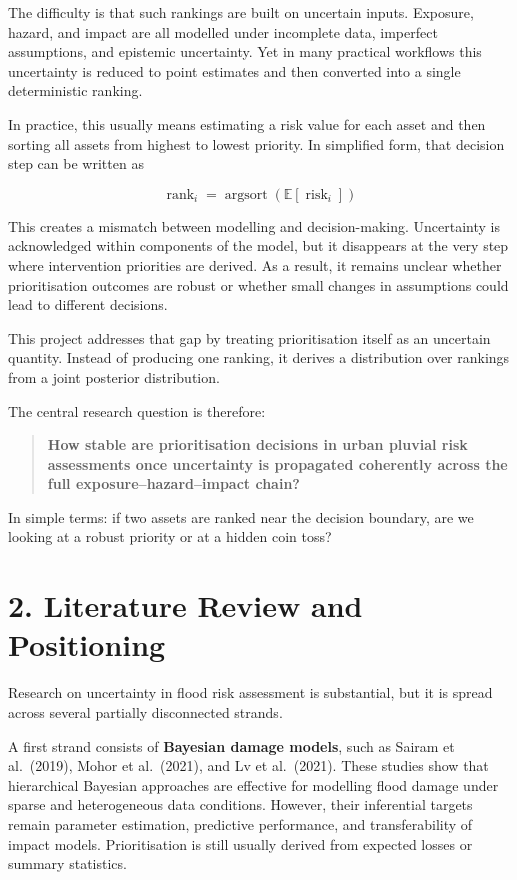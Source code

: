 \documentclass[
]{article}
\begin{document}
The difficulty is that such rankings are built on uncertain inputs.
Exposure, hazard, and impact are all modelled under incomplete data,
imperfect assumptions, and epistemic uncertainty. Yet in many practical
workflows this uncertainty is reduced to point estimates and then
converted into a single deterministic ranking.

In practice, this usually means estimating a risk value for each asset
and then sorting all assets from highest to lowest priority. In
simplified form, that decision step can be written as

\[
\operatorname{rank}_i = \operatorname{argsort}\!\left(\mathbb{E}[\operatorname{risk}_i]\right)
\]

This creates a mismatch between modelling and decision-making.
Uncertainty is acknowledged within components of the model, but it
disappears at the very step where intervention priorities are derived.
As a result, it remains unclear whether prioritisation outcomes are
robust or whether small changes in assumptions could lead to different
decisions.

This project addresses that gap by treating prioritisation itself as an
uncertain quantity. Instead of producing one ranking, it derives a
distribution over rankings from a joint posterior distribution.

The central research question is therefore:

\begin{quote}
\textbf{How stable are prioritisation decisions in urban pluvial risk
assessments once uncertainty is propagated coherently across the full
exposure--hazard--impact chain?}
\end{quote}

In simple terms: if two assets are ranked near the decision boundary,
are we looking at a robust priority or at a hidden coin toss?

\section{2. Literature Review and
Positioning}\label{literature-review-and-positioning}

Research on uncertainty in flood risk assessment is substantial, but it
is spread across several partially disconnected strands.

A first strand consists of \textbf{Bayesian damage models}, such as
Sairam et al.~(2019), Mohor et al.~(2021), and Lv et al.~(2021). These
studies show that hierarchical Bayesian approaches are effective for
modelling flood damage under sparse and heterogeneous data conditions.
However, their inferential targets remain parameter estimation,
predictive performance, and transferability of impact models.
Prioritisation is still usually derived from expected losses or summary
statistics.
\end{document}
